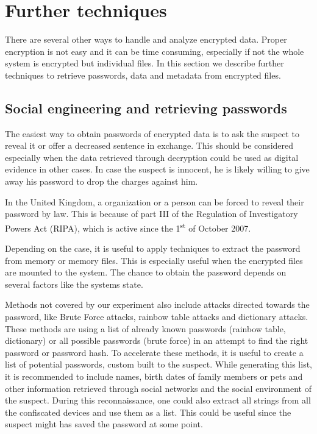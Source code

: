 \section{Further techniques}
There are several other ways to handle and analyze encrypted data. 
Proper encryption is not easy and it can be time consuming, especially if not the whole system is encrypted but individual files. 
In this section we describe further techniques to retrieve passwords, data and metadata from encrypted files.
\subsection{Social engineering and retrieving passwords}
The easiest way to obtain passwords of encrypted data is to ask the suspect to reveal it or offer a decreased sentence in exchange.
This should be considered especially when the data retrieved through decryption could be used as digital evidence in other cases.
In case the suspect is innocent, he is likely willing to give away his password to drop the charges against him.

In the United Kingdom, a organization or a person can be forced to reveal their password by law. 
This is because of part III of the Regulation of Investigatory Powers Act (RIPA), which is active since  the 1\textsuperscript{st} of October 2007.\cite{lowman2010effect}

Depending on the case, it is useful to apply techniques to extract the password from memory or  memory files. 
This is especially useful when the encrypted files are mounted to the system. 
The chance to obtain the password depends on several factors like the systems state.\cite{MaartmannMoe2009S132}

Methods not covered by our experiment also include attacks directed towards the password, like Brute Force attacks, rainbow table attacks and dictionary attacks. 
These methods are using a list of already known passwords (rainbow table, dictionary) or all possible passwords (brute force) in an attempt to find the right password or password hash.
To accelerate these methods, it is useful to create a list of potential passwords, custom built to the suspect. 
While generating this list, it is recommended to include names, birth dates of family members or pets and other information retrieved through social networks and the social environment of the suspect. 
During this reconnaissance, one could also extract all strings from all the confiscated devices and use them as a list. 
This could be useful since the suspect might has saved the password at some point. 

